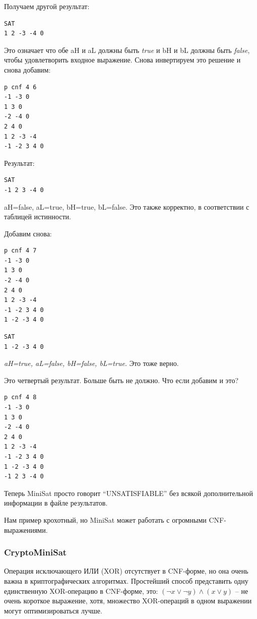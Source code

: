 Получаем другой результат:

\begin{lstlisting}
SAT
1 2 -3 -4 0
\end{lstlisting}

Это означает что обе aH и aL должны быть \textit{true} и bH и bL должны быть \textit{false}, чтобы удовлетворить
входное выражение.
Снова инвертируем это решение и снова добавим:

\begin{lstlisting}
p cnf 4 6
-1 -3 0
1 3 0
-2 -4 0
2 4 0
1 2 -3 -4
-1 -2 3 4 0
\end{lstlisting}

Результат:

\begin{lstlisting}
SAT
-1 2 3 -4 0
\end{lstlisting}

aH=false, aL=true, bH=true, bL=false. Это также корректно, в соответствии с таблицей истинности.

Добавим снова:

\begin{lstlisting}
p cnf 4 7
-1 -3 0
1 3 0
-2 -4 0
2 4 0
1 2 -3 -4
-1 -2 3 4 0
1 -2 -3 4 0
\end{lstlisting}

\begin{lstlisting}
SAT
1 -2 -3 4 0
\end{lstlisting}

\textit{aH=true, aL=false, bH=false, bL=true.} Это тоже верно.

Это четвертый результат. Больше быть не должно. Что если добавим и это?

\begin{lstlisting}
p cnf 4 8
-1 -3 0
1 3 0
-2 -4 0
2 4 0
1 2 -3 -4
-1 -2 3 4 0
1 -2 -3 4 0
-1 2 3 -4 0
\end{lstlisting}

Теперь MiniSat просто говорит ``UNSATISFIABLE'' без всякой дополнительной информации в файле результатов.

Нам пример крохотный, но MiniSat может работать с огромными \ac{CNF}-выражениями.

\subsubsection{CryptoMiniSat}

Операция исключающего ИЛИ (XOR) отсутствует в CNF-форме, но она очень важна в криптографических алгоритмах.
Простейший способ представить одну единственную XOR-операцию в CNF-форме, это:
$(\neg x \vee \neg y) \wedge (x \vee y)$ -- не очень короткое выражение,
хотя, множество XOR-операций в одном выражении могут оптимизироваться лучше.

